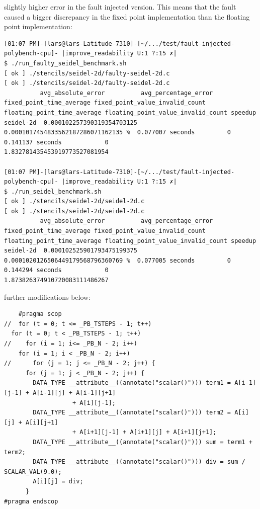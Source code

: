 slightly higher error in the fault injected version. This means that the fault caused a bigger discrepancy in the fixed point implementation than the floating point implementation:

\begin{verbatim}
[01:07 PM]-[lars@lars-Latitude-7310]-[~/.../test/fault-injected-polybench-cpu]- |improve_readability U:1 ?:15 ✗|
$ ./run_faulty_seidel_benchmark.sh 
[ ok ] ./stencils/seidel-2d/faulty-seidel-2d.c
[ ok ] ./stencils/seidel-2d/faulty-seidel-2d.c
          avg_absolute_error          avg_percentage_error                 fixed_point_time_average fixed_point_value_invalid_count floating_point_time_average floating_point_value_invalid_count speedup                       
seidel-2d  0.000102257390319354703125  0.0001017454833562187286071162135 %  0.077007 seconds         0                               0.141137 seconds            0                                  1.832781435453919773527081954

[01:07 PM]-[lars@lars-Latitude-7310]-[~/.../test/fault-injected-polybench-cpu]- |improve_readability U:1 ?:15 ✗|
$ ./run_seidel_benchmark.sh 
[ ok ] ./stencils/seidel-2d/seidel-2d.c
[ ok ] ./stencils/seidel-2d/seidel-2d.c
          avg_absolute_error          avg_percentage_error                 fixed_point_time_average fixed_point_value_invalid_count floating_point_time_average floating_point_value_invalid_count speedup                       
seidel-2d  0.000102525901793475199375  0.0001020126506449179568796360769 %  0.077005 seconds         0                               0.144294 seconds            0                                  1.873826374910720083111486267
\end{verbatim}


further modifications below:
\begin{verbatim}
    #pragma scop
//  for (t = 0; t <= _PB_TSTEPS - 1; t++)
  for (t = 0; t < _PB_TSTEPS - 1; t++)
//    for (i = 1; i<= _PB_N - 2; i++)
    for (i = 1; i < _PB_N - 2; i++)
//      for (j = 1; j <= _PB_N - 2; j++) {
      for (j = 1; j < _PB_N - 2; j++) {
        DATA_TYPE __attribute__((annotate("scalar()"))) term1 = A[i-1][j-1] + A[i-1][j] + A[i-1][j+1]
                   + A[i][j-1];
        DATA_TYPE __attribute__((annotate("scalar()"))) term2 = A[i][j] + A[i][j+1]
                   + A[i+1][j-1] + A[i+1][j] + A[i+1][j+1];
        DATA_TYPE __attribute__((annotate("scalar()"))) sum = term1 + term2;
        DATA_TYPE __attribute__((annotate("scalar()"))) div = sum / SCALAR_VAL(9.0);
        A[i][j] = div;
      }
#pragma endscop
\end{verbatim}

